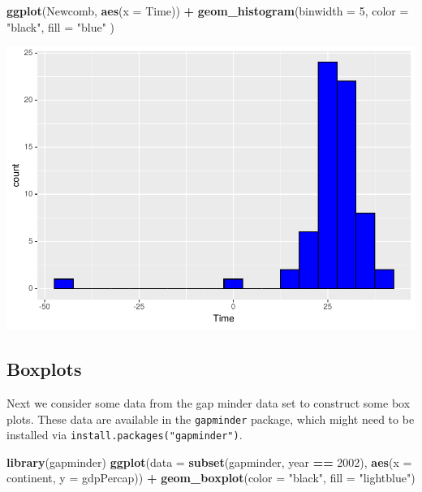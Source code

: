 \documentclass[
]{krantz}
\makeatletter
\newenvironment{Shaded}{\begin{snugshade}}{\end{snugshade}}
\newcommand{\DataTypeTok}[1]{\textcolor[rgb]{0.27,0.27,0.27}{#1}}
\newcommand{\DecValTok}[1]{\textcolor[rgb]{0.06,0.06,0.06}{#1}}
\newcommand{\KeywordTok}[1]{\textcolor[rgb]{0.27,0.27,0.27}{\textbf{#1}}}
\newcommand{\NormalTok}[1]{#1}
\newcommand{\OperatorTok}[1]{\textcolor[rgb]{0.43,0.43,0.43}{\textbf{#1}}}
\newcommand{\StringTok}[1]{\textcolor[rgb]{0.5,0.5,0.5}{#1}}
\newenvironment{kframe}{%
\medskip{}
\setlength{\fboxsep}{.8em}
 \def\at@end@of@kframe{}%
 \ifinner\ifhmode%
  \def\at@end@of@kframe{\end{minipage}}%
  \begin{minipage}{\columnwidth}%
 \fi\fi%
 \def\FrameCommand##1{\hskip\@totalleftmargin \hskip-\fboxsep
 \colorbox{shadecolor}{##1}\hskip-\fboxsep
     \hskip-\linewidth \hskip-\@totalleftmargin \hskip\columnwidth}%
 \MakeFramed {\advance\hsize-\width
   \@totalleftmargin\z@ \linewidth\hsize
   \@setminipage}}%
 {\par\unskip\endMakeFramed%
 \at@end@of@kframe}
\renewenvironment{Shaded}{\begin{kframe}}{\end{kframe}}
\makeatother
\begin{document}
\begin{Shaded}
\begin{Highlighting}[]
\KeywordTok{ggplot}\NormalTok{(Newcomb, }\KeywordTok{aes}\NormalTok{(}\DataTypeTok{x =}\NormalTok{ Time)) }\OperatorTok{+}\StringTok{ }
\StringTok{    }\KeywordTok{geom\_histogram}\NormalTok{(}\DataTypeTok{binwidth =} \DecValTok{5}\NormalTok{, }\DataTypeTok{color =} \StringTok{"black"}\NormalTok{, }\DataTypeTok{fill =} \StringTok{"blue"}\NormalTok{ )}
\end{Highlighting}
\end{Shaded}

\includegraphics{bookdown_files/figure-latex/unnamed-chunk-76-1.pdf}

\hypertarget{boxplots}{%
\subsection{Boxplots}\label{boxplots}}

Next we consider some data from the gap minder data set to construct some box plots. These data are available in the \texttt{gapminder} package, which might need to be installed via \texttt{install.packages("gapminder")}.

\begin{Shaded}
\begin{Highlighting}[]
\KeywordTok{library}\NormalTok{(gapminder)}
\KeywordTok{ggplot}\NormalTok{(}\DataTypeTok{data =} \KeywordTok{subset}\NormalTok{(gapminder,  year }\OperatorTok{==}\StringTok{ }\DecValTok{2002}\NormalTok{), }
       \KeywordTok{aes}\NormalTok{(}\DataTypeTok{x =}\NormalTok{ continent, }\DataTypeTok{y =}\NormalTok{ gdpPercap)) }\OperatorTok{+}\StringTok{ }
\StringTok{    }\KeywordTok{geom\_boxplot}\NormalTok{(}\DataTypeTok{color =} \StringTok{"black"}\NormalTok{, }\DataTypeTok{fill =} \StringTok{"lightblue"}\NormalTok{)}
\end{Highlighting}
\end{Shaded}
\end{document}
